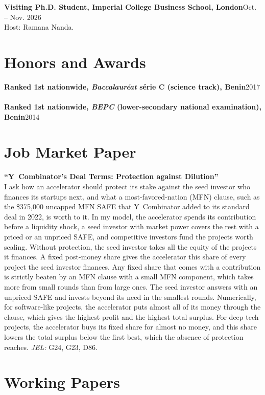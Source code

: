 \documentclass[11pt,a4paper]{article}
\newcommand{\entry}[2]{\textbf{#1}\hfill #2\\}
\begin{document}
\entry{Visiting Ph.D. Student, Imperial College Business School, London}{Oct. -- Nov. 2026}
\hspace{1em} Host: Ramana Nanda.

\section{Honors and Awards}

\entry{Ranked 1st nationwide, \emph{Baccalauréat} série C (science track), Benin}{2017}
\\[0.2em]
\entry{Ranked 1st nationwide, \emph{BEPC} (lower-secondary national examination), Benin}{2014}

\section{Job Market Paper}

\textbf{``Y~Combinator's Deal Terms: Protection against Dilution''}
\\[0.4em]
I ask how an accelerator should protect its stake against the seed investor who finances its startups next, and what a most-favored-nation (MFN) clause, such as the \$375,000 uncapped MFN SAFE that Y~Combinator added to its standard deal in 2022, is worth to it. In my model, the accelerator spends its contribution before a liquidity shock, a seed investor with market power covers the rest with a priced or an unpriced SAFE, and competitive investors fund the projects worth scaling. Without protection, the seed investor takes all the equity of the projects it finances. A fixed post-money share gives the accelerator this share of every project the seed investor finances. Any fixed share that comes with a contribution is strictly beaten by an MFN clause with a small MFN component, which takes more from small rounds than from large ones. The seed investor answers with an unpriced SAFE and invests beyond its need in the smallest rounds. Numerically, for software-like projects, the accelerator puts almost all of its money through the clause, which gives the highest profit and the highest total surplus. For deep-tech projects, the accelerator buys its fixed share for almost no money, and this share lowers the total surplus below the first best, which the absence of protection reaches. \emph{JEL:} G24, G23, D86.

\section{Working Papers}
\end{document}

